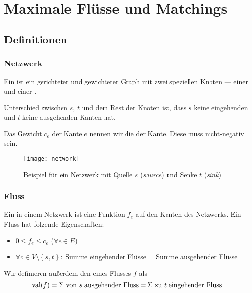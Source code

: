 \chapter{Maximale Flüsse und Matchings}

\newcommand{\pluseq}{\mathrel{+}=}
\newcommand{\minuseq}{\mathrel{-}=}

\section{Definitionen}

\subsection{Netzwerk}

Ein  ist ein gerichteter und gewichteter Graph mit zwei speziellen Knoten --- einer  und einer .

Unterschied zwischen \( s \), \( t \) und dem Rest der Knoten ist, dass \( s \) keine eingehenden und \( t \) keine ausgehenden Kanten hat. 

Das Gewicht \( c_e \) der Kante \( e \) nennen wir die  der Kante. Diese muss nicht-negativ sein.

\begin{figure}[H]
  \texttt{[image: network]}
  \caption{Beispiel für ein Netzwerk mit Quelle \( s \) (\emph{source}) und Senke \( t \) (\emph{sink})}
\end{figure}

\subsection{Fluss}

Ein  in einem Netzwerk ist eine Funktion \( f_e \) auf den Kanten des Netzwerks. Ein Fluss hat folgende Eigenschaften:

\begin{itemize}
  \item \( 0 \leq f_e \leq c_e \) (\( \forall e \in E \))
  \item \( \forall v \in V \setminus \left \{ s,t \right \} : \) Summe eingehender Flüsse = Summe ausgehender Flüsse
\end{itemize}

Wir definieren außerdem den  eines Flusses \( f \) als
\begin{equation*}
  \text{val}(f) = \Sigma \text{ von \( s \) ausgehender Fluss} = \Sigma \text{ zu \( t \) eingehender Fluss}
\end{equation*}

